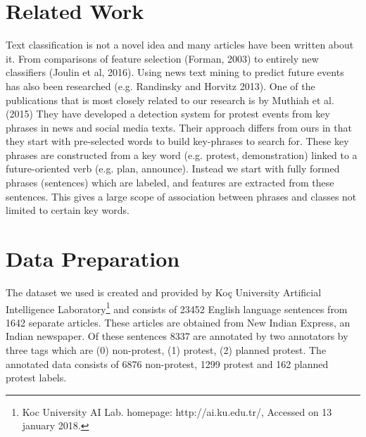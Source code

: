 \documentclass{article}
\begin{document}
\section{Related Work} 

Text classification is not a novel idea and many articles have been written about it. From comparisons of feature selection (Forman, 2003) to entirely new classifiers (Joulin et al, 2016). Using news text mining to predict future events has also been researched (e.g. Randinsky and Horvitz 2013).
One of the publications that is most closely related to our research is by Muthiah et al. (2015) They have developed a detection system for protest events from key phrases in news and social media texts. Their approach differs from ours in that they start with pre-selected words to build key-phrases to search for. These key phrases are constructed from a key word (e.g. protest, demonstration) linked to a future-oriented verb (e.g. plan, announce). Instead we start with fully formed phrases (sentences) which are labeled, and features are extracted from these sentences. This gives a large scope of association between phrases and classes not limited to certain key words. 









\section{Data Preparation}

The dataset we used is created and provided by Koç University Artificial Intelligence Laboratory\footnote{Koc University AI Lab. homepage: http://ai.ku.edu.tr/, Accessed on 13 january 2018.} and consists of 23452 English language sentences from 1642 separate articles. These articles are obtained from New Indian Express, an Indian newspaper. Of these sentences 8337 are annotated by two annotators by three tags which are (0) non-protest, (1) protest, (2) planned protest. The annotated data consists of 6876 non-protest, 1299 protest and 162 planned protest labels.
\end{document}
